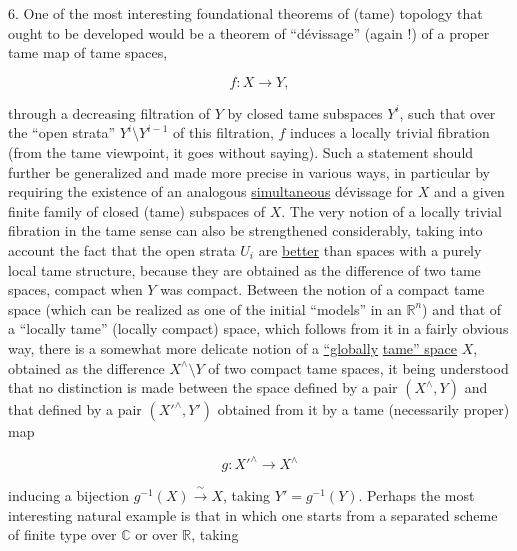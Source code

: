 
6. One of the most interesting foundational theorems of (tame)
topology that ought to be developed would be a theorem
of ``dévissage'' (again !) of a proper tame map
of tame spaces,

\[ f : X \longrightarrow Y , \]

through a decreasing filtration of $Y$ by closed tame
subspaces $Y^{i}$, such that over the ``open strata''
$Y^{i} \setminus Y^{i-1}$ of this filtration, $f$ induces a locally
trivial fibration (from the tame viewpoint, it goes without saying). Such
a statement should further be generalized and made more precise in various
ways, in particular by requiring the existence of an analogous
\uline{simultaneous} dévissage for $X$ and a given finite family of closed
(tame) subspaces of $X$. The very notion of a locally
trivial fibration in the tame sense can also be strengthened
considerably, taking into account the fact that the open
strata $U_{i}$ are \uline{better} than spaces with a purely local tame
structure, because they are obtained as the difference of
two tame spaces, compact when $Y$ was compact. Between the
notion of a compact tame space (which can be realized as one of the
initial ``models'' in an $\mathbb{R}^{n}$) and that of a ``locally
tame'' (locally compact) space, which follows from it in a fairly obvious
way, there is a somewhat more delicate notion of a \uline{``globally}
\uline{tame'' space} $X$, obtained as the difference $X^{\wedge}\setminus Y$ of two compact
tame spaces, it being understood that no distinction is made between
the space defined by a pair $(X^{\wedge},Y)$ and that defined by a
pair $(X'^{\wedge},Y')$ obtained from it by a tame
(necessarily proper) map

\[ g : X'^{\wedge} \longrightarrow X^{\wedge} \]

inducing a bijection $g^{-1}(X) \xrightarrow{\ \sim\ } X$, taking $Y' = g^{-1}(Y)$.
Perhaps the most interesting natural example is that in which one
starts from a separated scheme of finite type over $\mathbb{C}$ or over $\mathbb{R}$, taking


